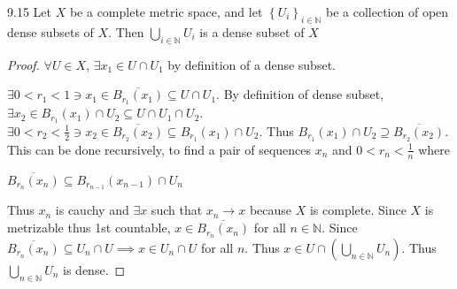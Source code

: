 \documentclass{article}
\newcommand*{\subeq}{\subseteq}
\newcommand{\N}{\mathbb{N}}
\begin{document}
\begin{claim}{9.15}\label{Claim 9.15.}
    Let $X$ be a complete metric space, and let $
    \left\{ U_i \right\} _{i \in \N}$ be a collection of open dense subsets of $X$. Then $\bigcup_{i \in \N} U_i$ is a dense subset of $X$      
\end{claim}
\begin{proof}
    $\forall U \in X$, $\exists x_1 \in U \cap U_1$ by definition of a dense subset. 
    
    $\exists 0 < r_1 < 1 \ni x_1 \in \overline{B_{r_1}(x_1)} \subeq U \cap U_1$. By definition of dense subset, $\exists x_2 \in B_{r_1}(x_1) \cap U_2 \subeq U \cap U_1 \cap U_2$. $\exists 0 < r_2 < \frac{1}{2} \ni x_2 \in \overline{B_{r_2}(x_2)} \subeq B_{r_1}(x_1) \cap U_2$. Thus $B_{r_1}(x_1) \cap U_2 \supseteq \overline{B_{r_2}(x_2)}$. This can be done recursively, to find a pair of sequences $x_n$ and $0 < r_n < \frac{1}{n}$ where
    
    $\overline{B_{r_n}(x_n)} \subeq B_{r_{n - 1}}(x_{n-1}) \cap U_n$ 

    Thus $x_n$ is cauchy and $\exists x$ such that $x_n \to x$ because $X$ is complete. Since $X$ is metrizable thus 1st countable, $x \in \overline{B_{r_n}(x_n)}$ for all $n \in \N$. Since $\overline{B_{r_n}(x_n)} \subeq U_n \cap U \implies x\in U_n \cap U$ for all $n$. Thus  $x \in U \cap (\bigcup_{n \in \N} U_n)$. Thus $\bigcup_{n \in \N} U_n$ is dense.             
\end{proof}
\end{document}
